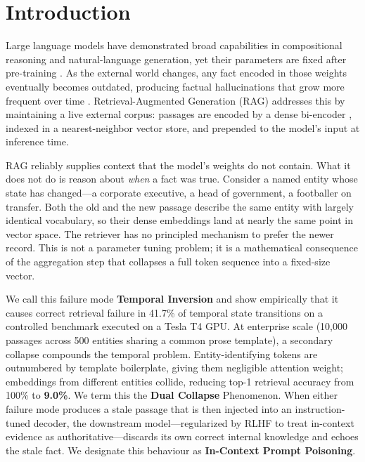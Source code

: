 \documentclass[11pt,a4paper,twocolumn]{article}
\newcommand{\dcolsym}{\textbf{Dual Collapse}}
\newcommand{\ticol}{\textbf{Temporal Inversion}}
\newcommand{\icpp}{\textbf{In-Context Prompt Poisoning}}
\begin{document}
\section{Introduction}
\label{sec:intro}

Large language models have demonstrated broad capabilities in
compositional reasoning and natural-language generation, yet their
parameters are fixed after pre-training \citep{lewis2020rag,
dhingra2022templama}. As the external world changes, any fact encoded
in those weights eventually becomes outdated, producing factual
hallucinations that grow more frequent over time
\citep{vu2023freshqa}.  Retrieval-Augmented Generation (RAG) addresses
this by maintaining a live external corpus: passages are encoded by a
dense bi-encoder \citep{reimers2019sentence}, indexed in a
nearest-neighbor vector store, and prepended to the model's input at
inference time.

RAG reliably supplies context that the model's weights do not contain.
What it does not do is reason about \emph{when} a fact was true.
Consider a named entity whose state has changed---a corporate
executive, a head of government, a footballer on transfer. Both the
old and the new passage describe the same entity with largely identical
vocabulary, so their dense embeddings land at nearly the same point in
vector space. The retriever has no principled mechanism to prefer the
newer record. This is not a parameter tuning problem; it is a
mathematical consequence of the aggregation step that collapses a full
token sequence into a fixed-size vector.

We call this failure mode \ticol{} and show empirically that it causes
correct retrieval failure in 41.7\% of temporal state transitions on a
controlled benchmark executed on a Tesla T4 GPU. At enterprise scale
(10{,}000 passages across 500 entities sharing a common prose
template), a secondary collapse compounds the temporal problem.
Entity-identifying tokens are outnumbered by template boilerplate,
giving them negligible attention weight; embeddings from different
entities collide, reducing top-1 retrieval accuracy from 100\% to
\textbf{9.0\%}. We term this the \dcolsym{} Phenomenon. When either
failure mode produces a stale passage that is then injected into an
instruction-tuned decoder, the downstream model---regularized by RLHF
to treat in-context evidence as authoritative---discards its own
correct internal knowledge and echoes the stale fact. We designate
this behaviour as \icpp{}.
\end{document}
